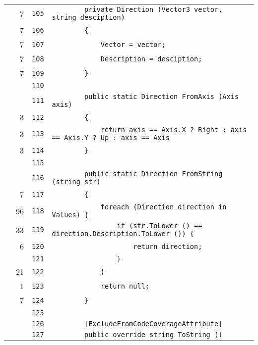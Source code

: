 \documentclass[a4paper,10pt]{article}
\begin{document}
\begin{longtable}[l]{lrrl}
\cellcolor{green} & 7 & \verb~105~ & \verb~        private Direction (Vector3 vector, string desciption)~\\
\cellcolor{green} & 7 & \verb~106~ & \verb~        {~\\
\cellcolor{green} & 7 & \verb~107~ & \verb~            Vector = vector;~\\
\cellcolor{green} & 7 & \verb~108~ & \verb~            Description = desciption;~\\
\cellcolor{green} & 7 & \verb~109~ & \verb~        }~\\
\cellcolor{gray} &  & \verb~110~ & \verb~~\\
\cellcolor{gray} &  & \verb~111~ & \verb~        public static Direction FromAxis (Axis axis)~\\
\cellcolor{green} & 3 & \verb~112~ & \verb~        {~\\
\cellcolor{green} & 3 & \verb~113~ & \verb~            return axis == Axis.X ? Right : axis == Axis.Y ? Up : axis == Axis~\\
\cellcolor{green} & 3 & \verb~114~ & \verb~        }~\\
\cellcolor{gray} &  & \verb~115~ & \verb~~\\
\cellcolor{gray} &  & \verb~116~ & \verb~        public static Direction FromString (string str)~\\
\cellcolor{green} & 7 & \verb~117~ & \verb~        {~\\
\cellcolor{green} & 96 & \verb~118~ & \verb~            foreach (Direction direction in Values) {~\\
\cellcolor{green} & 33 & \verb~119~ & \verb~                if (str.ToLower () == direction.Description.ToLower ()) {~\\
\cellcolor{green} & 6 & \verb~120~ & \verb~                    return direction;~\\
\cellcolor{gray} &  & \verb~121~ & \verb~                }~\\
\cellcolor{green} & 21 & \verb~122~ & \verb~            }~\\
\cellcolor{green} & 1 & \verb~123~ & \verb~            return null;~\\
\cellcolor{green} & 7 & \verb~124~ & \verb~        }~\\
\cellcolor{gray} &  & \verb~125~ & \verb~~\\
\cellcolor{gray} &  & \verb~126~ & \verb~        [ExcludeFromCodeCoverageAttribute]~\\
\cellcolor{gray} &  & \verb~127~ & \verb~        public override string ToString ()~\\

\end{longtable}
\end{document}

